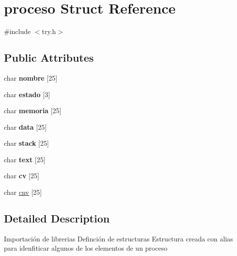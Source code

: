 \hypertarget{structproceso}{}\section{proceso Struct Reference}
\label{structproceso}


{\ttfamily \#include $<$try.\+h$>$}

\subsection*{Public Attributes}
\begin{DoxyCompactItemize}
\item 
\mbox{\label{structproceso_a6cb6c5bf77be1172d7da68042057e180}} 
char {\bfseries nombre} \mbox{[}25\mbox{]}
\item 
\mbox{\label{structproceso_a2dbdd737478ac85dd4d9cd926a8abcfe}} 
char {\bfseries estado} \mbox{[}3\mbox{]}
\item 
\mbox{\label{structproceso_aea5ed1d208c389e86cd78a26bfd1aaeb}} 
char {\bfseries memoria} \mbox{[}25\mbox{]}
\item 
\mbox{\label{structproceso_ab5b38b6fb6b25c7d30de6310c6079960}} 
char {\bfseries data} \mbox{[}25\mbox{]}
\item 
\mbox{\label{structproceso_a91269500664411efb564a09eaba1330b}} 
char {\bfseries stack} \mbox{[}25\mbox{]}
\item 
\mbox{\label{structproceso_a64a8eee0bdc4d521748a43cd0c7b4e8c}} 
char {\bfseries text} \mbox{[}25\mbox{]}
\item 
\mbox{\label{structproceso_a4abeac1a7247784f15c07ad2f11950be}} 
char {\bfseries cv} \mbox{[}25\mbox{]}
\item 
char \hyperlink{structproceso_a3f23ac5a5301973fede765cd4b5080d9}{cnv} \mbox{[}25\mbox{]}
\end{DoxyCompactItemize}


\subsection{Detailed Description}
Importación de librerias Definción de estructuras Estructura creada con alias para idenfiticar algunos de los elementos de un proceso 

